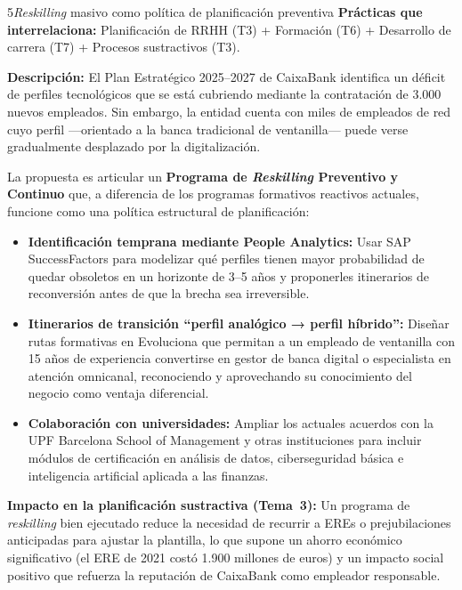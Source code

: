 \begin{recomendacion}{5}{\textit{Reskilling} masivo como política de planificación preventiva}
\textbf{Prácticas que interrelaciona:} Planificación de RRHH (T3) + Formación (T6) + Desarrollo de
carrera (T7) + Procesos sustractivos (T3).

\medskip
\textbf{Descripción:}
El Plan Estratégico 2025--2027 de CaixaBank identifica un déficit de perfiles
tecnológicos que se está cubriendo mediante la contratación de 3.000 nuevos
empleados. Sin embargo, la entidad cuenta con miles de empleados de red cuyo
perfil —orientado a la banca tradicional de ventanilla— puede verse gradualmente
desplazado por la digitalización.

La propuesta es articular un \textbf{Programa de \textit{Reskilling} Preventivo y
Continuo} que, a diferencia de los programas formativos reactivos actuales, funcione
como una política estructural de planificación:
\begin{itemize}
  \item \textbf{Identificación temprana mediante People Analytics:} Usar SAP
        SuccessFactors para modelizar qué perfiles tienen mayor probabilidad de
        quedar obsoletos en un horizonte de 3--5 años y proponerles itinerarios
        de reconversión antes de que la brecha sea irreversible.
  \item \textbf{Itinerarios de transición ``perfil analógico → perfil híbrido'':}
        Diseñar rutas formativas en Evoluciona que permitan a un empleado de
        ventanilla con 15 años de experiencia convertirse en gestor de banca digital
        o especialista en atención omnicanal, reconociendo y aprovechando su
        conocimiento del negocio como ventaja diferencial.
  \item \textbf{Colaboración con universidades:} Ampliar los actuales acuerdos
        con la UPF Barcelona School of Management y otras instituciones para incluir
        módulos de certificación en análisis de datos, ciberseguridad básica
        e inteligencia artificial aplicada a las finanzas.
\end{itemize}
\textbf{Impacto en la planificación sustractiva (Tema~3):}
Un programa de \textit{reskilling} bien ejecutado reduce la necesidad de recurrir
a EREs o prejubilaciones anticipadas para ajustar la plantilla, lo que supone
un ahorro económico significativo (el ERE de 2021 costó 1.900 millones de euros)
y un impacto social positivo que refuerza la reputación de CaixaBank como empleador
responsable.
\end{recomendacion}

